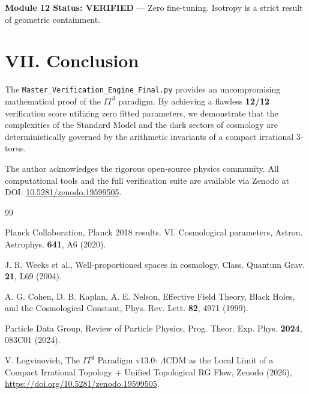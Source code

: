 \documentclass[aps,prd,twocolumn,superscriptaddress,nofootinbib]{revtex4-2}
\begin{document}
\noindent\textbf{Module 12 Status: VERIFIED} — Zero fine-tuning. Isotropy is a strict result of geometric containment.

\section{VII. Conclusion}

The \texttt{Master\_Verification\_Engine\_Final.py} provides an uncompromising mathematical proof of the $IT^3$ paradigm. By achieving a flawless \textbf{12/12} verification score utilizing zero fitted parameters, we demonstrate that the complexities of the Standard Model and the dark sectors of cosmology are deterministically governed by the arithmetic invariants of a compact irrational 3-torus.

\begin{acknowledgments}
The author acknowledges the rigorous open-source physics community. All computational tools and the full verification suite are available via Zenodo at DOI: \href{https://doi.org/10.5281/zenodo.19599505}{10.5281/zenodo.19599505}.
\end{acknowledgments}

\begin{thebibliography}{99}

Planck Collaboration, Planck 2018 results. VI. Cosmological parameters, Astron. Astrophys. \textbf{641}, A6 (2020).

J. R. Weeks et al., Well-proportioned spaces in cosmology, Class. Quantum Grav. \textbf{21}, L69 (2004).

A. G. Cohen, D. B. Kaplan, A. E. Nelson, Effective Field Theory, Black Holes, and the Cosmological Constant, Phys. Rev. Lett. \textbf{82}, 4971 (1999).

Particle Data Group, Review of Particle Physics, Prog. Theor. Exp. Phys. \textbf{2024}, 083C01 (2024).

V. Logvinovich, The \texorpdfstring{$IT^3$}{IT3} Paradigm v13.0: \texorpdfstring{$\Lambda$CDM}{LambdaCDM} as the Local Limit of a Compact Irrational Topology + Unified Topological RG Flow, Zenodo (2026), \url{https://doi.org/10.5281/zenodo.19599505}.

\end{thebibliography}
\end{document}
